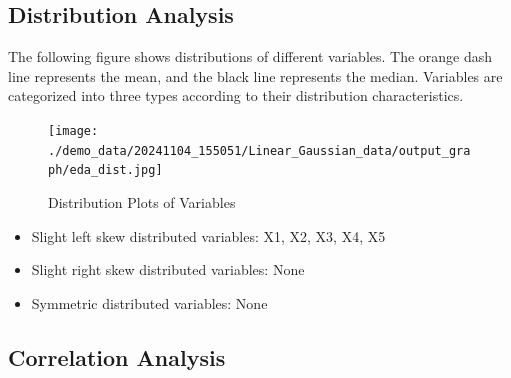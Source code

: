 \documentclass{article}
\begin{document}
\subsection{Distribution Analysis}
The following figure shows distributions of different variables. The orange dash line represents the mean, and the black line represents the median. Variables are categorized into three types according to their distribution characteristics.

\begin{figure}[H]
\centering
\texttt{[image: ./demo\_data/20241104\_155051/Linear\_Gaussian\_data/output\_graph/eda\_dist.jpg]}
\caption{\label{fig:dist}Distribution Plots of Variables}
\end{figure}

\begin{itemize}
\item Slight left skew distributed variables: X1, X2, X3, X4, X5
\item Slight right skew distributed variables: None
\item Symmetric distributed variables: None
\end{itemize}

\subsection{Correlation Analysis}
\end{document}
